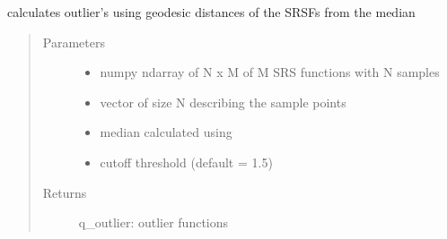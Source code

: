 \documentclass[letterpaper,10pt,english]{sphinxmanual}
\begin{document}
\begin{fulllineitems}
\label{\detokenize{utility_functions:utility_functions.outlier_detection}}
calculates outlier’s using geodesic distances of the SRSFs from the median
\begin{quote}\begin{description}
\item[{Parameters}] \leavevmode\begin{itemize}
\item {} 
 \textendash{} numpy ndarray of N x M of M SRS functions with N samples

\item {} 
 \textendash{} vector of size N describing the sample points

\item {} 
 \textendash{} median calculated using 

\item {} 
 \textendash{} cutoff threshold (default = 1.5)

\end{itemize}

\item[{Returns}] \leavevmode
q\_outlier: outlier functions

\end{description}\end{quote}

\end{fulllineitems}

\end{document}

